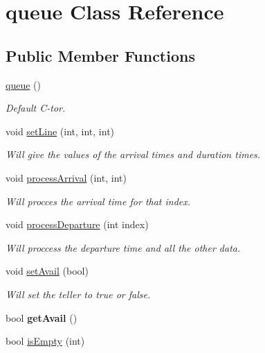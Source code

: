 \hypertarget{classqueue}{}\section{queue Class Reference}
\label{classqueue}
\subsection*{Public Member Functions}
\begin{DoxyCompactItemize}
\item 
\mbox{\hyperlink{classqueue_a7d34ca890402e85d02107280b32ae73a}{queue}} ()
\begin{DoxyCompactList}\small\item\em Default C-\/tor. \end{DoxyCompactList}\item 
void \mbox{\hyperlink{classqueue_a9bf05e186958b9596da62d11cd98d4d3}{set\+Line}} (int, int, int)
\begin{DoxyCompactList}\small\item\em Will give the values of the arrival times and duration times. \end{DoxyCompactList}\item 
void \mbox{\hyperlink{classqueue_ad57a0212e99a26f1c4a06600fe2961ff}{process\+Arrival}} (int, int)
\begin{DoxyCompactList}\small\item\em Will procces the arrival time for that index. \end{DoxyCompactList}\item 
void \mbox{\hyperlink{classqueue_a2fcf02e929268e153260003c43cfc458}{process\+Departure}} (int index)
\begin{DoxyCompactList}\small\item\em Will proccess the departure time and all the other data. \end{DoxyCompactList}\item 
void \mbox{\hyperlink{classqueue_a1f6c6898237b4e8768d0b5749baf304c}{set\+Avail}} (bool)
\begin{DoxyCompactList}\small\item\em Will set the teller to true or false. \end{DoxyCompactList}\item 
\mbox{\label{classqueue_a899b7c7762d4c82618f75a5eb92bd2b0}} 
bool {\bfseries get\+Avail} ()
\item 
bool \mbox{\hyperlink{classqueue_a3e8602b62836e36122d074c52a09b1d1}{is\+Empty}} (int)

\end{DoxyCompactItemize}
